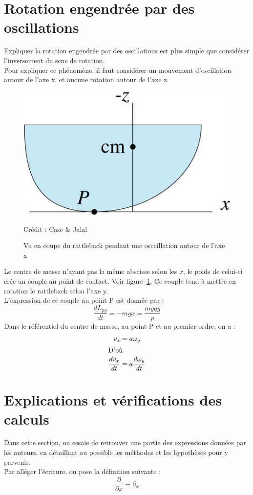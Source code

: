 \documentclass[12pt,a4paper]{article}
\begin{document}
	\section{Rotation engendrée par des oscillations}
	Expliquer la rotation engendrée par des oscillations est plus simple que considérer l'inversement du sens de rotation.\\
	Pour expliquer ce phénomène, il faut considérer un mouvement d'oscillation autour de l'axe x, et aucune rotation autour de l'axe z.
	\begin{figure}
		\centering
		\includegraphics[width=0.7\linewidth]{res/coupe}
		\caption{Vu en coupe du rattleback pendant une osccillation autour de l'axe x}{Crédit : Case \& Jalal}
		\label{fig:coupe}
	\end{figure}
	Le centre de masse n'ayant pas la même abscisse selon les $x$, le poids de celui-ci crée un couple au point de contact. Voir figure~\ref{fig:coupe}. Ce couple tend à mettre en rotation le rattleback selon l'axe y.\\
	L'expression de ce couple au point P est donnée par :
	\begin{equation}
		\dfrac{dL_{py}}{dt}=-mgx=\dfrac{mgqy}{p}
	\end{equation}
	Dans le référentiel du centre de masse, au point P et au premier ordre, on a :
	\begin{align}
		v_x&=a \omega_y\\
		\intertext{D'où}
		\dfrac{dv_x}{dt}&=a\dfrac{d\omega_y}{dt}
	\end{align}
	\section{Explications et vérifications des calculs}
	\label{sec:calculs}
	Dans cette section, on essaie de retrouver une partie des expressions données par les auteurs, en détaillant au possible les méthodes et les hypothèses pour y parvenir.\\
	Par alléger l'écriture, on pose la définition suivante :
	$$\dfrac{\partial}{\partial x}\equiv\partial_x$$ 
\end{document}
